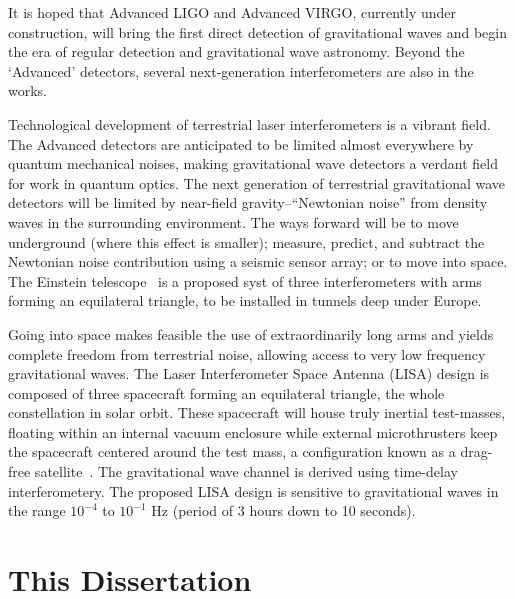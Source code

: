 It is hoped that Advanced LIGO and Advanced VIRGO, currently under
construction, will bring the first direct detection of gravitational
waves and begin the era of regular detection and gravitational wave
astronomy.
%
Beyond the `Advanced' detectors, several next-generation
interferometers are also in the works.

Technological development of terrestrial laser
interferometers is a vibrant field.  The Advanced detectors are
anticipated to be limited almost everywhere by quantum mechanical
noises, making gravitational wave detectors a verdant field for work
in quantum optics.  The next generation of terrestrial gravitational
wave detectors will be limited by near-field gravity--``Newtonian
noise'' from density waves in the surrounding environment.  The ways
forward will be to move underground (where this effect is smaller);
measure, predict, and subtract the Newtonian noise contribution using
a seismic sensor array; or to move into space.
%
The Einstein telescope~\cite{EinsteinTelescopeDesignStudy2011} is a
proposed syst of three interferometers with arms forming an
equilateral triangle, to be installed in tunnels deep under Europe.

Going into space makes feasible the use of extraordinarily long arms
and yields complete freedom from terrestrial noise, allowing access to
very low frequency gravitational waves.  The Laser Interferometer
Space Antenna (LISA) design is composed of three spacecraft forming an
equilateral triangle, the whole constellation in solar orbit.  These
spacecraft will house truly inertial test-masses, floating within an
internal vacuum enclosure while external microthrusters keep the
spacecraft centered around the test mass, a configuration known as a drag-free satellite~\cite{Lange1964DragFree}.  The gravitational wave
channel is derived using time-delay interferometery.  The proposed
LISA design is sensitive to gravitational waves in the range $10^{-4}$
to $10^{-1}$ Hz (period of 3 hours down to 10 seconds).

\section{This Dissertation}

